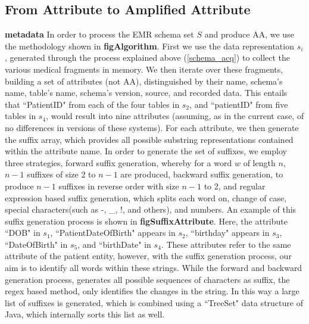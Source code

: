 \subsection*{From Attribute to Amplified Attribute}
\label{schema_prepro}
\textbf{metadata}
In order to process the EMR schema set $S$ and produce AA, we use the methodology shown in \textbf{figAlgorithm}.
First we use the data representation $s_i$, generated through the process explained above (\ref{schema_acq}) to collect the various medical fragments in memory. We then iterate over these fragments, building a set of attributes (not AA), distinguished by their name, schema's name, table's name, schema's version, source, and recorded data. This entails that ``PatientID" from each of the four tables in $s_2$, and ``patientID" from five tables in $s_4$, would result into nine attributes (assuming, as in the current case, of no differences in versions of these systems).
For each attribute, we then generate the suffix array, which provides all possible substring representations contained within the attribute name. In order to generate the set of suffixes, we employ three strategies, forward suffix generation, whereby for a word $w$ of length $n$, $n-1$ suffixes of size 2 to $n-1$ are produced, backward suffix generation, to produce $n-1$ suffixes in reverse order with size $n-1$ to 2, and regular expression based suffix generation, which splits each word on, change of case, special characters(such as -, \_, !, and others), and numbers. An example of this suffix generation process is shown in \textbf{figSuffixAttribute}. 
Here, the attribute ``DOB" in $s_1$, ``PatientDateOfBirth" appears in $s_2$, ``birthday" appears in $s_3$, ``DateOfBirth" in $s_5$, and ``birthDate" in $s_4$. These attributes refer to the same attribute of the patient entity, however, with the suffix generation process, our aim is to identify all words within these strings. While the forward and backward generation process, generates all possible sequences of characters as suffix, the regex based method, only identifies the changes in the string. In this way a large list of suffixes is generated, which is combined using a ``TreeSet" data structure of Java, which internally sorts this list as well.

